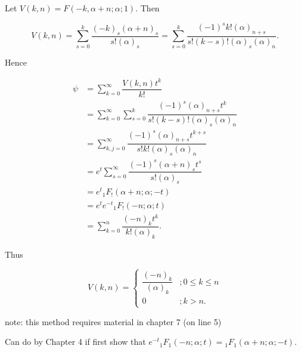 \begin{solution}
Let $V(k,n) = F(-k,\alpha+n;\alpha;1).$ Then

$$V(k,n) = \displaystyle\sum_{s=0}^k \dfrac{(-k)_s (\alpha+n)_s}{s! (\alpha)_s} = \displaystyle\sum_{s=0}^k \dfrac{(-1)^s k! (\alpha)_{n+s}}{s! (k-s)! (\alpha)_s (\alpha)_n}.$$

Hence

$$\begin{array}{ll}
\psi &= \displaystyle\sum_{k=0}^{\infty} \dfrac{V(k,n)t^k}{k!} \\
&= \displaystyle\sum_{k=0}^{\infty} \displaystyle\sum_{s=0}^k \dfrac{(-1)^s (\alpha)_{n+s} t^k}{s! (k-s)! (\alpha)_s (\alpha)_n} \\
&= \displaystyle\sum_{k,j=0}^{\infty} \dfrac{(-1)^s (\alpha)_{n+s} t^{k+s}}{s! k! (\alpha)_s (\alpha)_n} \\
&= e^t \displaystyle\sum_{s=0}^{\infty} \dfrac{(-1)^s (\alpha+n)_s t^s}{s! (\alpha)_s} \\
&= e^t {}_1F_!(\alpha+n;\alpha;-t) \\
&= e^t e^{-t} {}_1F_!(-n;\alpha;t) \\
&= \displaystyle\sum_{k=0}^n \dfrac{(-n)_k t^k}{k! (\alpha)_k}.
\end{array}$$

Thus

$$V(k,n) = \left\{ \begin{array}{ll}
\dfrac{(-n)_k}{(\alpha)_k} &; 0 \leq k \leq n \\
0 &; k > n.
\end{array} \right.$$

note: this method requires material in chapter 7 (on line 5)

Can do by Chapter 4 if first show that $e^{-t} {}_1F_1(-n;\alpha;t) =  {}_1F_1(\alpha+n;\alpha;-t).$
\end{solution}